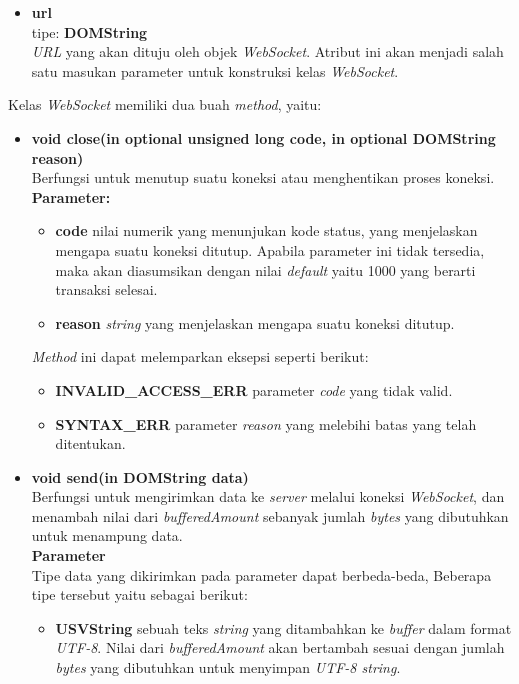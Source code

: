 \documentclass[a4paper,twoside]{article}
\begin{document}
\begin{enumerate}
\begin{enumerate}
\begin{itemize}
				\item \textbf{url} \\ tipe: \textbf{DOMString} \\ \textit{URL} yang akan dituju oleh objek \textit{WebSocket}. Atribut ini akan menjadi salah satu masukan parameter untuk konstruksi kelas \textit{WebSocket}.
			\end{itemize}
			
			Kelas \textit{WebSocket} memiliki dua buah \textit{method}, yaitu:
			
			\begin{itemize}
				\item \textbf{void close(in optional unsigned long code, in optional DOMString reason)} \\ Berfungsi untuk menutup suatu koneksi atau menghentikan proses koneksi. \\ \textbf{Parameter:} 
				\begin{itemize}
					\item \textbf{code} nilai numerik yang menunjukan kode status, yang menjelaskan mengapa suatu koneksi ditutup. Apabila parameter ini tidak tersedia, maka akan diasumsikan dengan nilai \textit{default} yaitu 1000 yang berarti transaksi selesai.
					\item \textbf{reason} \textit{string} yang menjelaskan mengapa suatu koneksi ditutup. 
				\end{itemize}
				\textit{Method} ini dapat melemparkan eksepsi seperti berikut:
				\begin{itemize}
					\item \textbf{INVALID\_ACCESS\_ERR} parameter \textit{code} yang tidak valid.
					\item \textbf{SYNTAX\_ERR} parameter \textit{reason} yang melebihi batas yang telah ditentukan.
				\end{itemize}
				
				\item \textbf{void send(in DOMString data)} \\ Berfungsi untuk mengirimkan data ke \textit{server} melalui koneksi \textit{WebSocket}, dan menambah nilai dari \textit{bufferedAmount} sebanyak jumlah \textit{bytes} yang dibutuhkan untuk menampung data. \\ \textbf{Parameter} \\ Tipe data yang dikirimkan pada parameter dapat berbeda-beda, Beberapa tipe tersebut yaitu sebagai berikut:
				
				\begin{itemize}
					\item \textbf{USVString} sebuah teks \textit{string} yang ditambahkan ke \textit{buffer} dalam format \textit{UTF-8}. Nilai dari \textit{bufferedAmount} akan bertambah sesuai dengan jumlah \textit{bytes} yang dibutuhkan untuk menyimpan \textit{UTF-8 string}.
					

\end{itemize}
\end{itemize}
\end{enumerate}
\end{enumerate}
\end{document}
